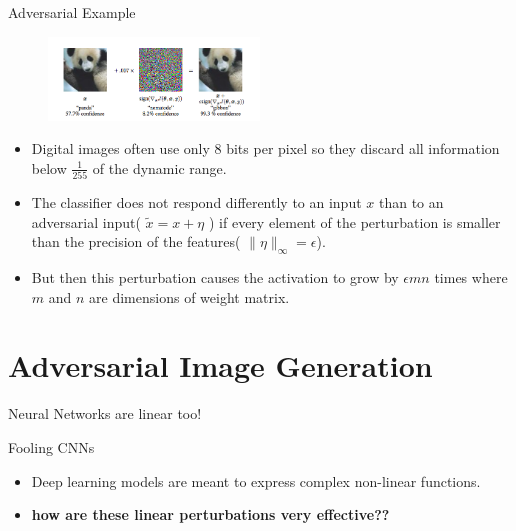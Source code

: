\documentclass[10pt]{beamer}
\begin{document}
\begin{frame}{Adversarial Example}
	\begin{figure}
		\includegraphics[width=0.5\textwidth]{panda-break}
	\end{figure}

\begin{itemize}
	\item Digital images often use only 8 bits per pixel so they discard all information below $\frac{1}{255}$ of the dynamic range.
	\item The classifier does not respond differently to an input $x$ than to an adversarial input( $\tilde{x} = x + \eta$ ) if every element of the perturbation is smaller than the precision of the features( $\|\eta \|_{\infty} = \epsilon$). 
	\item But then this perturbation causes the activation to grow by $\epsilon m n$ times where $m$ and $n$ are dimensions of weight matrix.
		
\end{itemize}
\end{frame}

\section{Adversarial Image Generation}

\begin{frame}{Neural Networks are linear too!}
	\begin{alertblock}{Fooling CNNs}
	\begin{itemize}[<+- | alert@+>]
		\item Deep learning models are meant to express complex non-linear functions.
		\item \alert{\textbf{how are these linear perturbations very effective??}}
	\end{itemize}
	\end{alertblock}

\end{frame}
\end{document}
